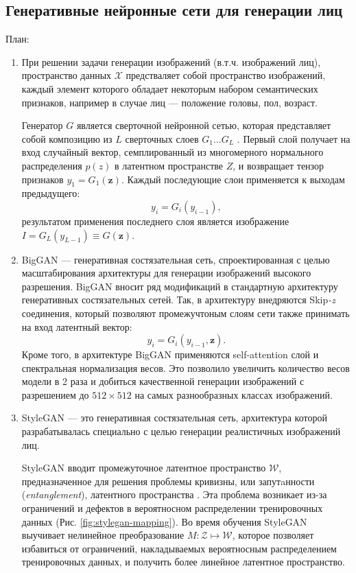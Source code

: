 \subsection{Генеративные нейронные сети для генерации лиц}

План:

\begin{enumerate}

\item 
При решении задачи генерации изображений (в.т.ч. изображений лиц), пространство данных $\mathcal X$ предстваляет собой пространство изображений, каждый элемент которого обладает некоторым набором семантических признаков, например в случае лиц --- положение головы, пол, возраст.

Генератор $G$ является сверточной нейронной сетью, которая представляет собой композицию из $L$ сверточных слоев $G_1 ... G_L$ . 
Первый слой получает на вход случайный вектор, семплированный из многомерного нормального распределения $p(z)$ в латентном пространстве $Z$, и возвращает тензор признаков $y_1 = G_1(\mathbf z)$. 
Каждый последующие слои применяется к выходам предыдущего: 
$$ y_i = G_i(y_{i-1}), $$
результатом применения последнего слоя является изображение $I = G_L(y_{L-1}) \equiv G(\mathbf z)$.


\item
%
BigGAN \cite{bigGAN} --- генеративная состязательная сеть, спроектированная с целью масштабирования архитектуры для генерации изображений высокого разрешения.
BigGAN вносит ряд модификаций в стандартную архитектуру генеративных состязательных сетей.
Так, в архитектуру внедряются Skip\emph{-z} соединения, который позволяют промежучтоным слоям сети также принимать на вход латентный вектор:
$$ y_i = G_i(y_{i-1}, \mathbf z). $$
Кроме того, в архитектуре BigGAN применяются self-attention слой и спектральная нормализация весов.
Это позволило увеличить количество весов модели в 2 раза и добиться качественной генерации изображений с разрешением до $512\times512$ на самых разнообразных классах изображений.

\item
%
StyleGAN \cite{StyleGAN} --– это генеративная состязательная сеть, архитектура которой разрабатывалась специально с целью генерации реалистичных изображений лиц.

StyleGAN вводит промежуточное латентное пространство $\mathcal W$, предназначенное для решения проблемы кривизны, или запутaнности (\emph{entanglement}), латентного пространства \cite{arvanitidis2018oddity}. 
Эта проблема возникает из-за ограничений и дефектов в вероятносном распределении тренировочных данных (Рис. \ref{fig:stylegan-mapping}). 
Во время обучения StyleGAN выучивает нелинейное преобразование $M: \mathcal Z \mapsto \mathcal W$, которое позволяет избавиться от ограничений, накладываемых вероятносным распределением тренировочных данных, и получить более линейное латентное пространство.


\end{enumerate}
